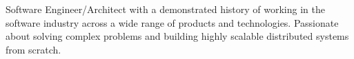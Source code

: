 

\begin{cvparagraph}

Software Engineer/Architect with a demonstrated history of working in the software industry across a wide range of products and technologies. Passionate about solving complex problems and building highly scalable distributed systems from scratch.
\end{cvparagraph}
